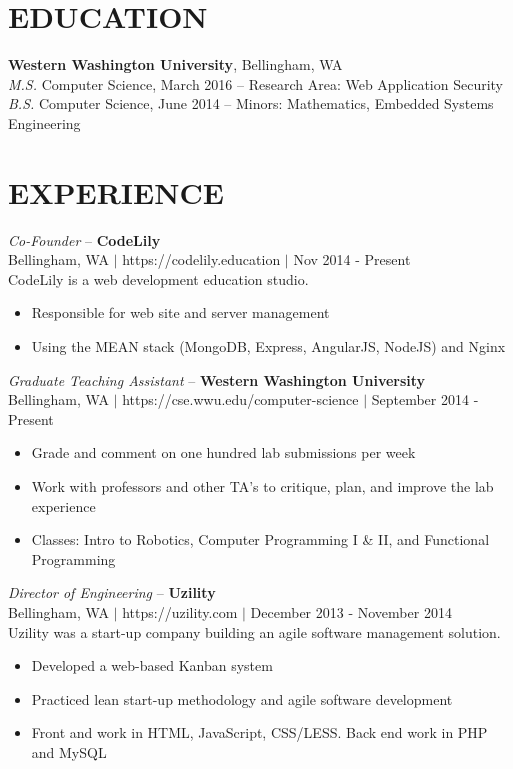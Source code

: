 \documentclass[line,margin]{res}
\begin{document}
\address{425.241.7977 $|$ kyle.rader@ieee.org $|$ https://kylerader.ninja $|$ github.com/kyle-rader}

\begin{resume}
 
\section{EDUCATION}
	{\bf Western Washington University}, Bellingham, WA \\
	{\sl M.S.} Computer Science, {\small March 2016} -- Research Area: Web Application Security \\
	{\sl B.S.} Computer Science, {\small June 2014} -- Minors: Mathematics, Embedded Systems Engineering

\section{EXPERIENCE}

	{\sl Co-Founder} -- {\bf CodeLily} \\
	{\footnotesize Bellingham, WA $|$ https://codelily.education $|$ Nov 2014 - Present}\\
	CodeLily is a web development education studio.
	\begin{itemize} \itemsep -2pt
		\item Responsible for web site and server management
		\item Using the MEAN stack (MongoDB, Express, AngularJS, NodeJS) and Nginx
	\end{itemize}

	{\sl Graduate Teaching Assistant} -- {\bf Western Washington University} \\
	{\footnotesize Bellingham, WA $|$ https://cse.wwu.edu/computer-science $|$ September 2014 - Present}
	\begin{itemize} \itemsep -2pt
		\item Grade and comment on one hundred lab submissions per week
		\item Work with professors and other TA's to critique, plan, and improve the lab experience
		\item Classes: Intro to Robotics, Computer Programming I \& II, and Functional Programming
	\end{itemize}

	{\sl Director of Engineering} -- {\bf Uzility} \\
	{\footnotesize Bellingham, WA $|$ https://uzility.com $|$ December 2013 - November 2014} \\
	Uzility was a start-up company building an agile software management solution.
	\begin{itemize}  \itemsep -2pt
		\item Developed a web-based Kanban system
		\item Practiced lean start-up methodology and agile software development
		\item Front and work in HTML, JavaScript, CSS/LESS. Back end work in PHP and MySQL
	\end{itemize}
	

\end{resume}
\end{document}
